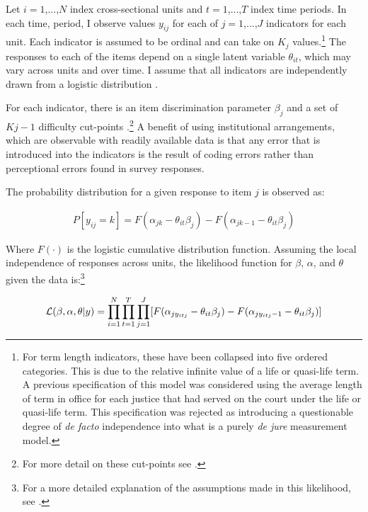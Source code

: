 \documentclass[12pt]{article}
\begin{document}
Let $i=1$,...,$N$ index cross-sectional units and $t=1$,...,$T$ index time periods.  In each time, period, I observe values $y_{ij}$ for each of $j=1$,...,$J$ indicators for each unit.  Each indicator is assumed to be ordinal and can take on $K_j$ values.\footnote{For term length indicators, these have been collapsed into five ordered categories.  This is due to the relative infinite value of a life or quasi-life term.  A previous specification of this model was considered using the average length of term in office for each justice that had served on the court under the life or quasi-life term.  This specification was rejected as introducing a questionable degree of \textit{de facto} independence into what is a purely \textit{de jure} measurement model.}  The responses to each of the items depend on a single latent variable $\theta_{it}$, which may vary across units and over time. I assume that all indicators are independently drawn from a logistic distribution \citep[7]{Schnakenberg2014}. 

For each indicator, there is an item discrimination parameter $\beta_j$ and a set of $Kj-1$ difficulty cut-points \citep[7]{Schnakenberg2014}.\footnote{For more detail on these cut-points see \citet{Treier2008,Schnakenberg2014}.}  A benefit of using institutional arrangements, which are observable with readily available data is that any error that is introduced into the indicators is the result of coding errors rather than perceptional errors found in survey responses.  

The probability distribution for a given response to item $j$ is observed as:

\begin{align}
P[y_{ij}=k]=F(\alpha_{jk}-\theta_{it}\beta_j)-F(\alpha_{jk-1}-\theta_{it}\beta_j)
\end{align} 

Where $F(\cdot)$ is the logistic cumulative distribution function.  Assuming the local independence of responses across units, the likelihood function for $\beta$, $\alpha$, and $\theta$ given the data is:\footnote{For a more detailed explanation of the assumptions made in this likelihood, see \citet[8]{Schnakenberg2014}.}

\begin{align}\label{like}
{\cal L} (\beta,\alpha,\theta|y)=\prod_{i=1}^{N}\prod_{t=1}^{T}\prod_{j=1}^{J}[F(\alpha_{jy_{itj}}-\theta_{it}\beta_j)-F(\alpha_{jy_{itj}-1}-\theta_{it}\beta_j)]
\end{align} 
\end{document}
